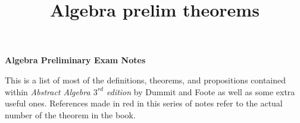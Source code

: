 
\title{Algebra prelim theorems}





\begin{center}
\textbf{\Large Algebra Preliminary Exam Notes}
\end{center}

This is a list of most of the definitions, theorems, and propositions contained within \textit{Abstract Algebra $3^{rd}$ edition} by Dummit and Foote as well as some extra useful ones. References made in red in this series of notes refer to the actual number of the theorem in the book.\\

\tableofcontents
\newpage








